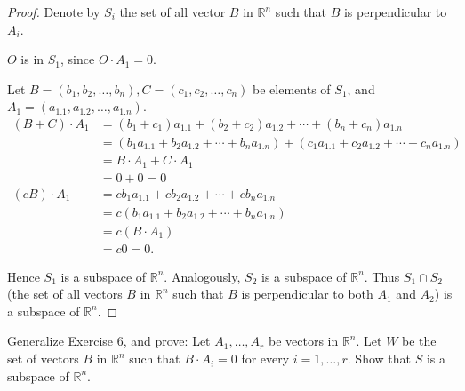 \begin{proof}
    Denote by $S_{i}$ the set of all vector $B$ in $\mathbb{R}^{n}$ such that $B$ is perpendicular to $A_{i}$.

    $O$ is in $S_{1}$, since $O\cdot A_{1} = 0$.

    Let $B = (b_{1}, b_{2}, \ldots, b_{n}), C = (c_{1}, c_{2}, \ldots, c_{n})$ be elements of $S_{1}$, and $A_{1} = (a_{1.1}, a_{1.2}, \ldots, a_{1.n})$.
    \begin{align*}
        (B + C)\cdot A_{1} & = (b_{1} + c_{1})a_{1.1} + (b_{2} + c_{2})a_{1.2} + \cdots + (b_{n} + c_{n})a_{1.n}                             \\
                           & = (b_{1}a_{1.1} + b_{2}a_{1.2} + \cdots + b_{n}a_{1.n}) + (c_{1}a_{1.1} + c_{2}a_{1.2} + \cdots + c_{n}a_{1.n}) \\
                           & = B\cdot A_{1} + C\cdot A_{1}                                                                                   \\
                           & = 0 + 0 = 0                                                                                                     \\
        (cB)\cdot A_{1}    & = cb_{1}a_{1.1} + cb_{2}a_{1.2} + \cdots + cb_{n}a_{1.n}                                                        \\
                           & = c(b_{1}a_{1.1} + b_{2}a_{1.2} + \cdots + b_{n}a_{1.n})                                                        \\
                           & = c(B\cdot A_{1})                                                                                               \\
                           & = c0 = 0.
    \end{align*}

    Hence $S_{1}$ is a subspace of $\mathbb{R}^{n}$. Analogously, $S_{2}$ is a subspace of $\mathbb{R}^{n}$. Thus $S_{1}\cap S_{2}$ (the set of all vectors $B$ in $\mathbb{R}^{n}$ such that $B$ is perpendicular to both $A_{1}$ and $A_{2}$) is a subspace of $\mathbb{R}^{n}$.
\end{proof}

\begin{exercise}
    Generalize Exercise 6, and prove: Let $A_{1}, \ldots, A_{r}$ be vectors in $\mathbb{R}^{n}$. Let $W$ be the set of vectors $B$ in $\mathbb{R}^{n}$ such that $B\cdot A_{i} = 0$ for every $i = 1,\ldots, r$. Show that $S$ is a subspace of $\mathbb{R}^{n}$.
\end{exercise}

